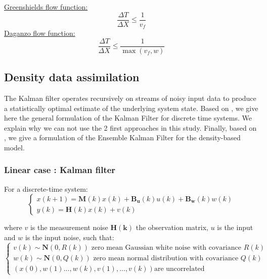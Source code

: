 \documentclass[letterpaper,10pt]{article}
\begin{document}
\noindent\underline{Greenshields flow function:} 
\begin{equation}\label{eq:cfl_Gr}
\frac{\Delta T}{\Delta X} \leq \frac{1}{v_f}
\end{equation} 
 \noindent\underline{Daganzo flow function:} 
\begin{equation}\label{eq:cfl_D}
\frac{\Delta T}{\Delta X} \leq \frac{1}{\max(v_f,w)}
\end{equation} 

\subsection{Density data assimilation}
The Kalman filter operates recursively on streams of noisy input data to produce a statistically optimal estimate of the underlying system state. Based on \cite{Evensen2007}, we give here the general formulation of the Kalman Filter for discrete time systems. We explain why we can not use the 2 first approaches in this study. Finally, based on \cite{Work2010}, we give a formulation of the Ensemble Kalman Filter for the density-based model.
\subsubsection{Linear case : Kalman filter}

\noindent For a discrete-time system:
\begin{equation}\label{KF_lin}
\left\{\begin{array}{lcl} 
x(k+1) = \mathbf{M}(k)x(k) + \mathbf{B_u}(k)u(k) + \mathbf{B_w}(k)w(k)\\
y(k) = \mathbf{H}(k)x(k) + v(k)
\end{array}\right.
\end{equation}

\noindent where $v$ is the measurement noise $\mathbf{H(k)}$ the observation matrix, $u$ is the input and $w$ is the input noise, such that:
\begin{equation}\label{KF_conditions}
\left\{\begin{array}{lcl}
v(k) \sim \mathbf{N}(0,R(k))\text{ zero mean Gaussian white noise with covariance }R(k)\\
w(k) \sim \mathbf{N}(0,Q(k)) \text{ zero mean normal distribution with covariance }Q(k)\\
(x(0),w(1)...,w(k),v(1),...,v(k)) \text{are  uncorrelated}
\end{array}\right.
\end{equation}
\end{document}
